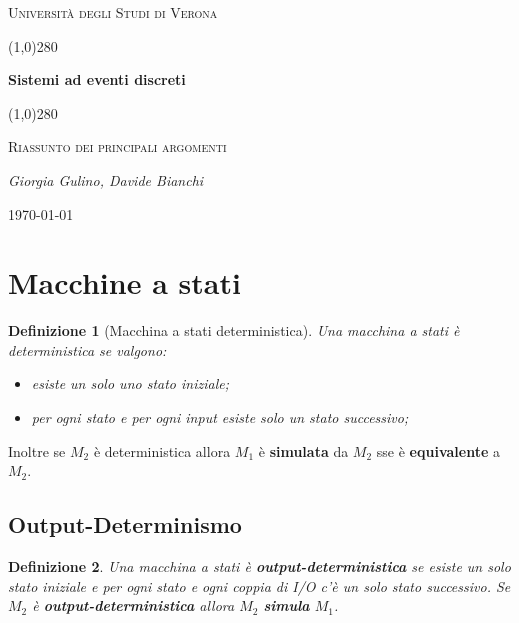 \documentclass[a4paper, 11pt]{article}
\date{\today}
\newcommand{\od}{\textbf{output-deterministica }}
\newtheorem{definit}{Definizione}[subsection]
\begin{document}
 \clearpage
 \begin{titlepage}
 	\centering
 	\vspace*{\fill}
 	{\scshape\LARGE Università degli Studi di Verona \par}
 	\vspace{1.5cm}
 	\line(1,0){280} \\
 	{\huge\bfseries Sistemi ad eventi discreti\par}
 	\line(1,0){280} \\
 	\vspace{0.5cm}
 	{\scshape\Large Riassunto dei principali argomenti\par}
 	\vspace{2cm}
 	{\Large\itshape Giorgia Gulino, Davide Bianchi\par}
 	\vspace{1cm}

 	\vspace{5cm}
 	\vspace*{\fill}
 	{\large \today\par}
 \end{titlepage}
 \thispagestyle{empty}
\newpage
\tableofcontents
\newpage

\section{Macchine a stati}

\begin{definit}[Macchina a stati deterministica]
Una macchina a stati è deterministica se valgono: \begin{itemize}
	\item esiste un solo uno stato iniziale;
	\item per ogni stato e per ogni input esiste solo un stato successivo;
\end{itemize}  
\end{definit}
Inoltre se $M_2$ è deterministica allora $M_1$ è \textbf{simulata} da $M_2$ sse è \textbf{equivalente} a $M_2$.

\subsection{Output-Determinismo}
\begin{definit}
	Una macchina a stati è \textbf{output-deterministica} se esiste un solo stato iniziale e per ogni stato e ogni coppia di I/O c'è un solo stato successivo. Se $M_2$ è \od allora $M_2$ \textbf{simula} $M_1$.
\end{definit}
\end{document}
